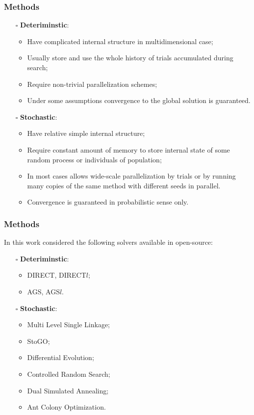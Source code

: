 \documentclass[aspectratio=1610]{beamer}
\begin{document}
\begin{frame}
  \frametitle{Methods}
  \begin{itemize}
    \item[$\square$] \textbf{Deteriminstic}:
    \begin{itemize}
      \item Have complicated internal structure in multidimensional case;
      \item Usually store and use the whole history of trials accumulated during search;
      \item Require non-trivial parallelization schemes;
      \item Under some assumptions convergence to the global solution is guaranteed.
    \end{itemize}
    \item[$\square$] \textbf{Stochastic}:
    \begin{itemize}
      \item Have relative simple internal structure;
      \item Require constant amount of memory to store internal state of some random process or individuals of population;
      \item In most cases allows wide-scale parallelization by trials or by running many copies of the same method
      with different seeds in parallel.
      \item Convergence is guaranteed in probabilistic sense only.
    \end{itemize}
  \end{itemize}
\end{frame}

\begin{frame}
  \frametitle{Methods}
  In this work considered the following solvers available in open-source:
  \begin{itemize}
    \item[$\square$] \textbf{Deteriminstic}:
    \begin{itemize}
      \item DIRECT, DIRECT$l$;
      \item AGS, AGS$l$.
    \end{itemize}
    \item[$\square$] \textbf{Stochastic}:
    \begin{itemize}
      \item Multi Level Single Linkage;
      \item StoGO;
      \item Differential Evolution;
      \item Controlled Random Search;
      \item Dual Simulated Annealing;
      \item Ant Colony Optimization.
    \end{itemize}
  \end{itemize}
\end{frame}
\end{document}
